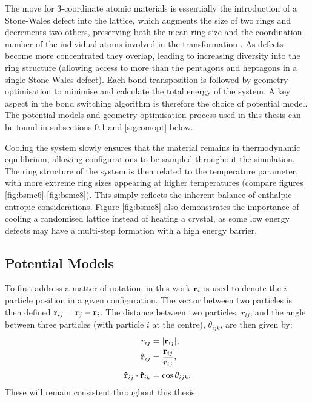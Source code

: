 The \mc{} move for 3\--coordinate atomic materials is essentially the introduction of a Stone\--Wales defect into the lattice, which
augments the size of two rings and decrements two others, preserving both the mean ring size and the coordination number of the individual atoms involved in the transformation \cite{Stone1986}.
As defects become more concentrated they overlap, leading to increasing diversity into the ring structure (allowing access to more than the pentagons and heptagons in a single Stone\--Wales defect).
Each bond transposition is followed by geometry optimisation to minimise and calculate the total energy of the system.  
A key aspect in the bond switching algorithm is therefore the choice of potential model.
The potential models and geometry optimisation process used in this thesis can be found in subsections \ref{s:potentials} and \ref{s:geomopt} below.

Cooling the system slowly ensures that the material remains in thermodynamic equilibrium, allowing configurations to be sampled throughout the simulation.
The ring structure of the system is then related to the temperature parameter, with more extreme ring sizes appearing at higher temperatures (compare figures \ref{fig:bsmc6}\--\ref{fig:bsmc8}).
This simply reflects the inherent balance of enthalpic \vs{} entropic  considerations.
Figure \ref{fig:bsmc8} also demonstrates the importance of cooling a randomised lattice instead of heating a crystal, as some low energy defects may have a multi\--step formation with a high energy barrier.  

\subsection{Potential Models}
\label{s:potentials}

To first address a matter of notation, in this work $\mathbf{r}_{i}$ is used to denote the $i$\th{} particle position in a given configuration.
The vector between two particles is then defined $\mathbf{r}_{ij}=\mathbf{r}_{j}-\mathbf{r}_{i}$.
The distance between two particles, $r_{ij}$, and the angle between three particles (with particle $i$ at the centre), $\theta_{ijk}$, are then given by:
\begin{align}
	r_{ij} &= \lvert\mathbf{r}_{ij}\rvert, \label{eq:notr}\\
	\boldsymbol{\hat{\mathbf{r}}}_{ij} &= \frac{\mathbf{r}_{ij}}{r_{ij}}, \\
	\boldsymbol{\hat{\mathbf{r}}}_{ij} \cdot \boldsymbol{\hat{\mathbf{r}}}_{ik}&=\cos\theta_{ijk}\label{eq:nott}.
\end{align}
These will remain consistent throughout this thesis.

